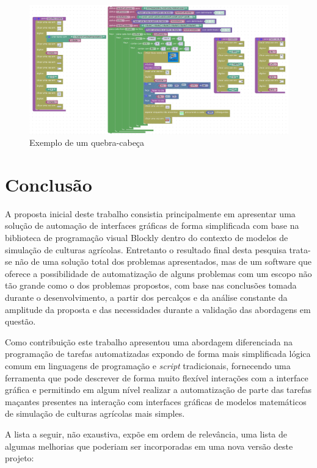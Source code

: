 \documentclass[tg]{mdtufsm}
\begin{document}
            \begin{figure}[!htb]
                {\centering
                \includegraphics[width=1.0\textwidth]{imagens/simanihotBlock.png}
                \caption{Exemplo de um quebra-cabeça}
                \label{fig:simanibloco}}
            \end{figure}

        \chapter {Conclusão}

            A proposta inicial deste trabalho consistia principalmente em apresentar uma solução de automação de interfaces gráficas de forma simplificada com base na biblioteca de programação visual Blockly dentro do contexto de modelos de simulação de culturas agrícolas. Entretanto o resultado final desta pesquisa trata-se não de uma solução total dos problemas apresentados, mas de um software que oferece a possibilidade de automatização de alguns problemas com um escopo não tão grande como o dos problemas propostos, com base nas conclusões tomada durante o desenvolvimento, a partir dos percalços e da análise constante da amplitude da proposta e das necessidades durante a validação das abordagens em questão.

            Como contribuição este trabalho apresentou uma abordagem diferenciada na programação de tarefas automatizadas expondo de forma mais simplificada lógica comum em linguagens de programação e \emph{script} tradicionais, fornecendo uma ferramenta que pode descrever de forma muito flexível interações com a interface gráfica e permitindo em algum nível realizar a automatização de parte das tarefas maçantes presentes na interação com interfaces gráficas de modelos matemáticos de simulação de culturas agrícolas mais simples.

            A lista a seguir, não exaustiva, expõe em ordem de relevância, uma lista  de algumas melhorias que poderiam ser incorporadas em uma nova versão deste projeto:
\end{document}
